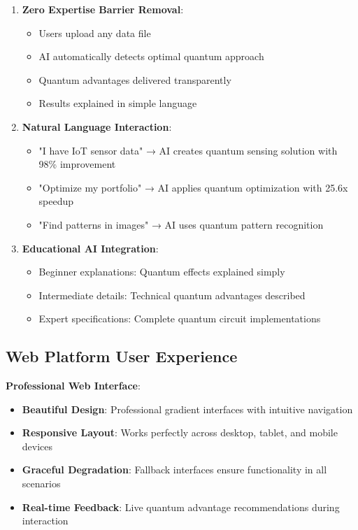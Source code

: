 \documentclass[12pt,a4paper]{article}
\begin{document}
\begin{enumerate}
    \item \textbf{Zero Expertise Barrier Removal}:
    \begin{itemize}
        \item Users upload any data file
        \item AI automatically detects optimal quantum approach
        \item Quantum advantages delivered transparently
        \item Results explained in simple language
    \end{itemize}
    
    \item \textbf{Natural Language Interaction}:
    \begin{itemize}
        \item "I have IoT sensor data" → AI creates quantum sensing solution with 98\% improvement
        \item "Optimize my portfolio" → AI applies quantum optimization with 25.6x speedup
        \item "Find patterns in images" → AI uses quantum pattern recognition
    \end{itemize}
    
    \item \textbf{Educational AI Integration}:
    \begin{itemize}
        \item Beginner explanations: Quantum effects explained simply
        \item Intermediate details: Technical quantum advantages described
        \item Expert specifications: Complete quantum circuit implementations
    \end{itemize}
\end{enumerate}

\subsection{Web Platform User Experience}

\textbf{Professional Web Interface}:
\begin{itemize}
    \item \textbf{Beautiful Design}: Professional gradient interfaces with intuitive navigation
    \item \textbf{Responsive Layout}: Works perfectly across desktop, tablet, and mobile devices
    \item \textbf{Graceful Degradation}: Fallback interfaces ensure functionality in all scenarios
    \item \textbf{Real-time Feedback}: Live quantum advantage recommendations during interaction
\end{itemize}
\end{document}
